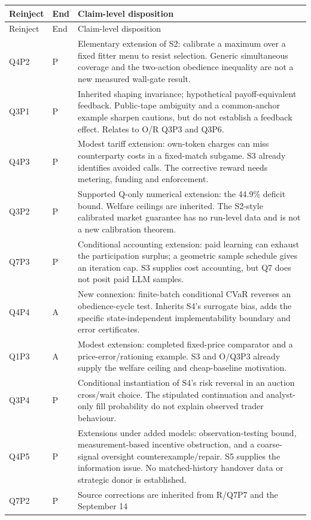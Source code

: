 \documentclass[11pt,a4paper]{article}
\begin{document}
\begin{longtable}{p{17mm}p{7mm}p{112mm}}
\toprule
Reinject&End&Claim-level disposition\\\midrule
\endfirsthead
\toprule Reinject&End&Claim-level disposition\\\midrule\endhead
Q4P2&P&Elementary extension of S2: calibrate a maximum over a fixed fitter
menu to resist selection. Generic simultaneous coverage and the two-action
obedience inequality are not a new measured wall-gate result.\\
Q3P1&P&Inherited shaping invariance; hypothetical payoff-equivalent feedback.
Public-tape ambiguity and a common-anchor example sharpen cautions, but do
not establish a feedback effect. Relates to O/R Q3P3 and Q3P6.\\
Q4P3&P&Modest tariff extension: own-token charges can miss counterparty
costs in a fixed-match subgame. S3 already identifies avoided calls.
The corrective reward needs metering, funding and enforcement.\\
Q3P2&P&Supported Q-only numerical extension: the 44.9\% deficit bound.
Welfare ceilings are inherited. The S2-style calibrated market guarantee
has no run-level data and is not a new calibration theorem.\\
Q7P3&P&Conditional accounting extension: paid learning can exhaust the
participation surplus; a geometric sample schedule gives an iteration cap.
S3 supplies cost accounting, but Q7 does not posit paid LLM samples.\\
Q4P4&A&New connexion: finite-batch conditional CVaR reverses an
obedience-cycle test. Inherits S4's surrogate bias, adds the specific
state-independent implementability boundary and error certificates.\\
Q1P3&A&Modest extension: completed fixed-price comparator and a
price-error/rationing example. S3 and O/Q3P3 already supply the welfare
ceiling and cheap-baseline motivation.\\
Q3P4&P&Conditional instantiation of S4's risk reversal in an auction
cross/wait choice. The stipulated continuation and analyst-only fill
probability do not explain observed trader behaviour.\\
Q4P5&P&Extensions under added models: observation-testing bound,
measurement-based incentive obstruction, and a coarse-signal oversight
counterexample/repair. S5 supplies the information issue. No matched-history
handover data or strategic donor is established.\\
Q7P2&P&Source corrections are inherited from R/Q7P7 and the September 14

\end{longtable}
\end{document}
